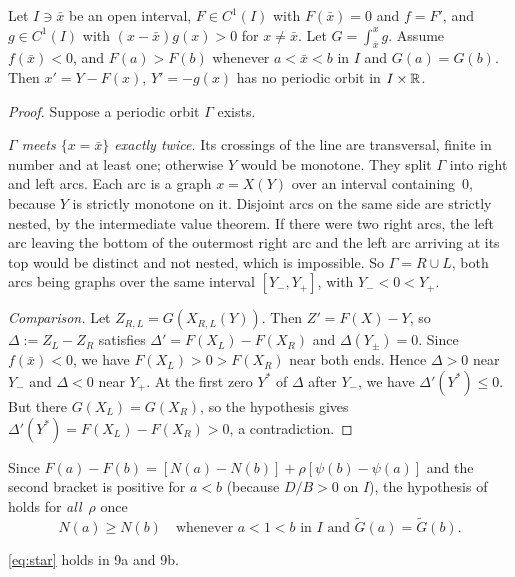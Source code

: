 \documentclass[11pt,a4paper]{report}
\newcommand{\Gt}{\widetilde G}
\begin{document}
\begin{lemma}\label{lem:comparison}
Let \(I\ni\bar x\) be an open interval, \(F\in C^1(I)\) with \(F(\bar x)=0\) and \(f=F'\), and \(g\in C^1(I)\) with
\((x-\bar x)g(x)>0\) for \(x\neq\bar x\). Let \(G=\int_{\bar x}^xg\). Assume \(f(\bar x)<0\), and \(F(a)>F(b)\)
whenever \(a<\bar x<b\) in \(I\) and \(G(a)=G(b)\). Then \(x'=Y-F(x)\), \(Y'=-g(x)\) has no periodic orbit in
\(I\times\mathbb{R}\).
\end{lemma}

\begin{proof}
Suppose a periodic orbit \(\Gamma\) exists.

\emph{\(\Gamma\) meets \(\{x=\bar x\}\) exactly twice.} Its crossings of the line are transversal, finite in number
and at least one; otherwise \(Y\) would be monotone. They split \(\Gamma\) into right and left arcs. Each arc is a
graph \(x=X(Y)\) over an interval containing~\(0\), because \(Y\) is strictly monotone on it. Disjoint arcs on the
same side are strictly nested, by the intermediate value theorem. If there were two right arcs, the left arc leaving
the bottom of the outermost right arc and the left arc arriving at its top would be distinct and not nested, which
is impossible. So \(\Gamma=R\cup L\), both arcs being graphs over the same interval \([Y_-,Y_+]\), with
\(Y_-<0<Y_+\).

\emph{Comparison.} Let \(Z_{R,L}=G(X_{R,L}(Y))\). Then \(Z'=F(X)-Y\), so \(\Delta:=Z_L-Z_R\) satisfies
\(\Delta'=F(X_L)-F(X_R)\) and \(\Delta(Y_\pm)=0\). Since \(f(\bar x)<0\), we have \(F(X_L)>0>F(X_R)\) near both ends.
Hence \(\Delta>0\) near \(Y_-\) and \(\Delta<0\) near \(Y_+\). At the first zero \(Y^*\) of \(\Delta\) after
\(Y_-\), we have \(\Delta'(Y^*)\le0\). But there \(G(X_L)=G(X_R)\), so the hypothesis gives
\(\Delta'(Y^*)=F(X_L)-F(X_R)>0\), a contradiction.
\end{proof}

Since \(F(a)-F(b)=[N(a)-N(b)]+\rho[\psi(b)-\psi(a)]\) and the second bracket is positive for \(a<b\) (because \(D/B>0\) on \(I\)), the hypothesis of
 holds for \emph{all}~\(\rho\) once
\begin{equation}\label{eq:star}
N(a)\ge N(b)\quad\text{whenever } a<1<b \text{ in } I \text{ and } \Gt(a)=\Gt(b).
\end{equation}

\begin{lemma}\label{lem:case9}
\eqref{eq:star} holds in 9a and 9b.
\end{lemma}
\end{document}
